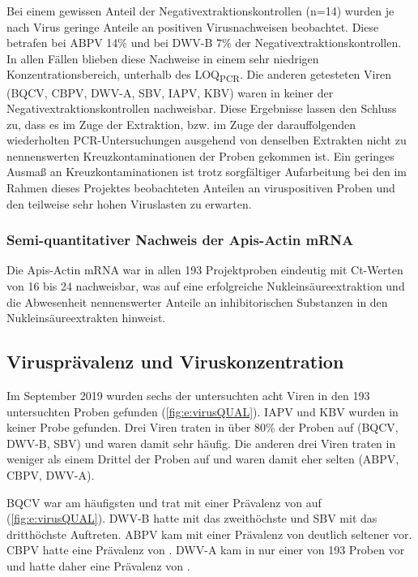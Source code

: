 Bei einem gewissen Anteil der Negativextraktionskontrollen (n=14) wurden je nach Virus geringe Anteile an positiven Virusnachweisen beobachtet. Diese betrafen bei ABPV 14\% und bei DWV-B 7\% der Negativextraktionskontrollen. In allen Fällen blieben diese Nachweise in einem sehr niedrigen Konzentrationsbereich, unterhalb des LOQ\textsubscript{PCR}. Die anderen getesteten Viren (BQCV, CBPV, DWV-A, SBV, IAPV, KBV) waren in keiner der Negativextraktionskontrollen nachweisbar. Diese Ergebnisse lassen den Schluss zu, dass es im Zuge der Extraktion, bzw. im Zuge der darauffolgenden wiederholten PCR-Untersuchungen ausgehend von denselben Extrakten nicht zu nennenswerten Kreuzkontaminationen der Proben gekommen ist. Ein geringes Ausmaß an Kreuzkontaminationen ist trotz sorgfältiger Aufarbeitung bei den im Rahmen dieses Projektes beobachteten Anteilen an viruspositiven Proben und den teilweise sehr hohen Viruslasten zu erwarten.

\subsubsection{Semi-quantitativer Nachweis der Apis-Actin mRNA}

Die Apis-Actin mRNA war in allen 193 Projektproben eindeutig mit Ct-Werten von 16 bis 24 nachweisbar, was auf eine erfolgreiche Nukleinsäureextraktion und die Abwesenheit nennenswerter Anteile an inhibitorischen Substanzen in den Nukleinsäureextrakten hinweist.

\subsection{Virusprävalenz und Viruskonzentration}

Im September 2019 wurden sechs der untersuchten acht Viren in den 193 untersuchten Proben gefunden (\cref{fig:e:virusQUAL}). IAPV und KBV wurden in keiner Probe gefunden. Drei Viren traten in über 80\% der Proben auf (BQCV, DWV-B, SBV) und waren damit sehr häufig. Die anderen drei Viren traten in weniger als einem Drittel der Proben auf und waren damit eher selten (ABPV, CBPV, DWV-A).

BQCV war am häufigsten und trat mit einer Prävalenz von  auf (\cref{fig:e:virusQUAL}). DWV-B hatte mit  das zweithöchste und SBV mit  das dritthöchste Auftreten. ABPV kam mit einer Prävalenz von  deutlich seltener vor. CBPV hatte eine Prävalenz von . DWV-A kam in nur einer von 193 Proben vor und hatte daher eine Prävalenz von .

